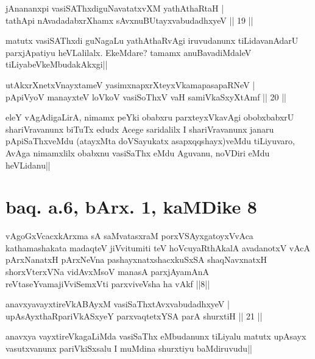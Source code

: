 \begin{shl}
jAnananxpi vasiSAThxdiguNavatatxvXM yathAthaRtaH | \\
tathA\s pi nAvadadabxrXhamx sAvxnuBUtayxvabudadhxyeV \hfill|| 19 || 
\end{shl}

\begin{artha}
matutx vasiSAThxdi guNagaLu yathAthaRvAgi iruvudanunx tiLidavanAdarU 
parxjApatiyu heVLalilalx. EkeMdare? tamamx anuBavadiMdaleV 
tiLiyabeVkeMbudakAkxgi||
\end{artha}


\begin{shl}
utAkxrXnetxV\s nayxtameV yasimxnapxrXteyxVkamapasapaRNeV | \\
pApiVyoV manayxteV loVkoV vasiSoThxV vaH samiVkaSxyXtAmf \hfill|| 20 || 
\end{shl}

\begin{artha}
eleY vAgAdigaLirA, nimamx peYki obabxru parxteyxVkavAgi obobxbabxrU 
shariVravanunx biTuTx edudx Acege saridalilx I shariVravanunx janaru 
pApiSaThxveMdu (atayxMta doVSayukatx asapxqqshayx)veMdu tiLiyuvaro, 
AvAga nimamxlilx obabxnu vasiSaThx eMdu Aguvanu, noVDiri eMdu 
heVLidanu||
\end{artha}

\section*{baq. a.6, bArx. 1, kaMDike 8}

\begin{shl}
vAgoGxVcacxkArxma sA saMvatasxraM porxVSAyxgatoyxVvAca kathamashakata madaqteV jiVvitumiti teV hoVcuyaRthAkalA avadanotxV vAcA pArxNanatxH pArxNeVna pashayxnatxshacxkuSxSA shaqNavxnatxH shorxVterxVNa vidAvxMsoV manasA parxjAyamAnA reVtaseYvamajiVviSemxVti parxviveVsha ha vAkf ||8||
\end{shl}


\begin{shl}
anavxyavayxtireVkABAyxM vasiSaThxtAvxvabudadhxyeV | \\
upAsAyxthaRpariVkASxyeY parxvaqtetxYSA parA shurxtiH \hfill|| 21 || 
\end{shl}

\begin{artha}
anavxya vayxtireVkagaLiMda vasiSaThx eMbudanunx tiLiyalu matutx 
upAsayx vasutxvanunx pariVkiSxsalu I muMdina shurxtiyu baMdiruvudu||
\end{artha}

